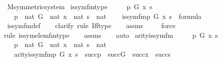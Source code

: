 \begin{isabellebody}
\isanewline
\isanewline
{}\isamarkupfalse%
\ M{\isacharunderscore}{\kern0pt}symmetric{\isacharunderscore}{\kern0pt}system\isanewline
{}\isanewline
\isanewline
{}\isamarkupfalse%
\ is{\isacharunderscore}{\kern0pt}sym{\isacharunderscore}{\kern0pt}fm{\isacharunderscore}{\kern0pt}type\ {\isacharcolon}{\kern0pt}\ \isanewline
\ \ \ p\ G\ x\ s\ \isanewline
\ \ \ {\isachardoublequoteopen}p\ {\isasymin}\ nat{\isachardoublequoteclose}\ {\isachardoublequoteopen}G\ {\isasymin}\ nat{\isachardoublequoteclose}\ {\isachardoublequoteopen}x\ {\isasymin}\ nat{\isachardoublequoteclose}\ {\isachardoublequoteopen}s\ {\isasymin}\ nat{\isachardoublequoteclose}\ \isanewline
\ \ \ {\isachardoublequoteopen}is{\isacharunderscore}{\kern0pt}sym{\isacharunderscore}{\kern0pt}fm{\isacharparenleft}{\kern0pt}p{\isacharcomma}{\kern0pt}\ G{\isacharcomma}{\kern0pt}\ x{\isacharcomma}{\kern0pt}\ s{\isacharparenright}{\kern0pt}\ {\isasymin}\ formula{\isachardoublequoteclose}\ \isanewline
%
\isadelimproof
\ \ %
\endisadelimproof
%
\isatagproof
{}\isamarkupfalse%
\ is{\isacharunderscore}{\kern0pt}sym{\isacharunderscore}{\kern0pt}fm{\isacharunderscore}{\kern0pt}def\ \isanewline
\ \ \isamarkupfalse%
{\isacharparenleft}{\kern0pt}clarify{\isacharcomma}{\kern0pt}\ rule\ Iff{\isacharunderscore}{\kern0pt}type{\isacharparenright}{\kern0pt}\isanewline
\ \ \isamarkupfalse%
\ assms\isanewline
\ \ \ \isamarkupfalse%
\ force\isanewline
\ \ \isamarkupfalse%
{\isacharparenleft}{\kern0pt}rule\ is{\isacharunderscore}{\kern0pt}sym{\isacharunderscore}{\kern0pt}elem{\isacharunderscore}{\kern0pt}fm{\isacharunderscore}{\kern0pt}type{\isacharparenright}{\kern0pt}\isanewline
\ \ \isamarkupfalse%
\ assms\isanewline
\ \ \isamarkupfalse%
\ auto%
\endisatagproof
{\isafoldproof}%
%
\isadelimproof
\isanewline
%
\endisadelimproof
\isanewline
{}\isamarkupfalse%
\ arity{\isacharunderscore}{\kern0pt}is{\isacharunderscore}{\kern0pt}sym{\isacharunderscore}{\kern0pt}fm\ {\isacharcolon}{\kern0pt}\ \isanewline
\ \ \ p\ G\ x\ s\ \isanewline
\ \ \ {\isachardoublequoteopen}p\ {\isasymin}\ nat{\isachardoublequoteclose}\ {\isachardoublequoteopen}G\ {\isasymin}\ nat{\isachardoublequoteclose}\ {\isachardoublequoteopen}x\ {\isasymin}\ nat{\isachardoublequoteclose}\ {\isachardoublequoteopen}s\ {\isasymin}\ nat{\isachardoublequoteclose}\ \isanewline
\ \ \ {\isachardoublequoteopen}arity{\isacharparenleft}{\kern0pt}is{\isacharunderscore}{\kern0pt}sym{\isacharunderscore}{\kern0pt}fm{\isacharparenleft}{\kern0pt}p{\isacharcomma}{\kern0pt}\ G{\isacharcomma}{\kern0pt}\ x{\isacharcomma}{\kern0pt}\ s{\isacharparenright}{\kern0pt}{\isacharparenright}{\kern0pt}\ {\isasymle}\ succ{\isacharparenleft}{\kern0pt}p{\isacharparenright}{\kern0pt}\ {\isasymunion}\ succ{\isacharparenleft}{\kern0pt}G{\isacharparenright}{\kern0pt}\ {\isasymunion}\ succ{\isacharparenleft}{\kern0pt}x{\isacharparenright}{\kern0pt}\ {\isasymunion}\ succ{\isacharparenleft}{\kern0pt}s{\isacharparenright}{\kern0pt}{\isachardoublequoteclose}\isanewline

\end{isabellebody}

